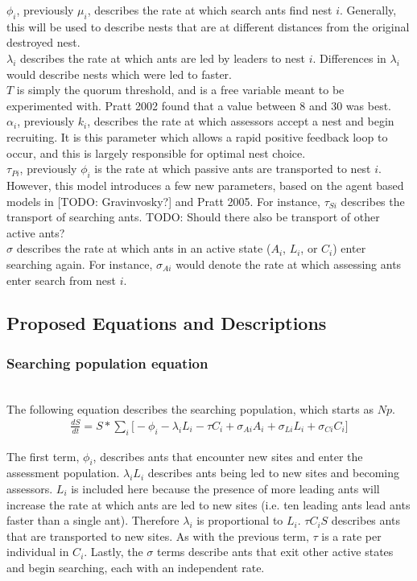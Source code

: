 \documentclass{article}
\begin{document}
$\phi_i$, previously $\mu_i$, describes the rate at which search ants find nest $i$. 
Generally, this will be used to describe nests that are at different distances from the original destroyed nest. \\
$\lambda_i$ describes the rate at which ants are led by leaders to nest $i$. 
Differences in $\lambda_i$ would describe nests which were led to faster. \\
$T$ is simply the quorum threshold, and is a free variable meant to be experimented with.
Pratt 2002 found that a value between $8$ and $30$ was best. \\
$\alpha_i$, previously $k_i$, describes the rate at which assessors accept a nest and begin recruiting.
It is this parameter which allows a rapid positive feedback loop to occur, and this is largely responsible for optimal nest choice. \\
$\tau_{Pi}$, previously $\phi_i$ is the rate at which passive ants are transported to nest $i$.
However, this model introduces a few new parameters, based on the agent based models in [TODO: Gravinvosky?] and Pratt 2005. 
For instance, $\tau_{Si}$ describes the transport of searching ants. 
TODO: Should there also be transport of other active ants? \\
$\sigma$ describes the rate at which ants in an active state ($A_i$, $L_i$, or $C_i$) enter searching again.
For instance, $\sigma_{Ai}$ would denote the rate at which assessing ants enter search from nest $i$.

\subsection{Proposed Equations and Descriptions}

\subsubsection{Searching population equation}
\hfill\\

The following equation describes the searching population, which starts as $Np$.
\begin{multline}
      \frac{dS}{dt} = S * \sum_i \big[- \phi_i - \lambda_iL_i - \tau C_i + \sigma_{Ai}A_i + \sigma_{Li}L_i + \sigma_{Ci}C_i \big]
\end{multline}

The first term, $\phi_i$, describes ants that encounter new sites and enter the assessment population.
$\lambda_iL_i$ describes ants being led to new sites and becoming assessors. $L_i$ is included here because the presence of more leading ants will increase the rate at which ants are led to new sites (i.e. ten leading ants lead ants faster than a single ant). Therefore $\lambda_i$ is proportional to $L_i$.
$\tau C_iS$ describes ants that are transported to new sites. As with the previous term, $\tau$ is a rate per individual in $C_i$.
Lastly, the $\sigma$ terms describe ants that exit other active states and begin searching, each with an independent rate.
\end{document}

